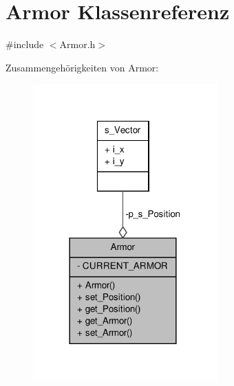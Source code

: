 \hypertarget{class_armor}{\section{Armor Klassenreferenz}
\label{class_armor}
}


{\ttfamily \#include $<$Armor.\-h$>$}



Zusammengehörigkeiten von Armor\-:
\nopagebreak
\begin{figure}[H]
\begin{center}
\leavevmode
\includegraphics[width=201pt]{class_armor__coll__graph}
\end{center}
\end{figure}

